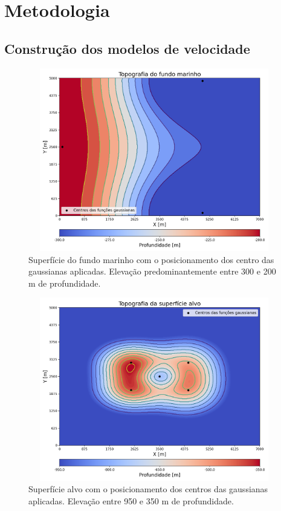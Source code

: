 \chapter{Metodologia}
\label{ch:metodologia}


\section{Construção dos modelos de velocidade}

\begin{figure}[H]
	\centering
	\includegraphics[width=11cm,height=8cm]{Imgs/Metodologia/water_bottom_surface_gaussian.png}
	\caption{Superfície do fundo marinho com o posicionamento dos centro das gaussianas aplicadas. Elevação predominantemente entre 300 e 200 m de profundidade.}
	\label{fig:water_bottom_surface_gaussian}	
\end{figure}


\begin{figure}[H]
	\centering
	\includegraphics[width=11cm,height=8cm]{Imgs/Metodologia/target_surface_gaussian.png}
	\caption{Superfície alvo com o posicionamento dos centros das gaussianas aplicadas. Elevação entre 950 e 350 m de profundidade.}
	\label{fig:target_surface_gaussian.png}	
\end{figure}


